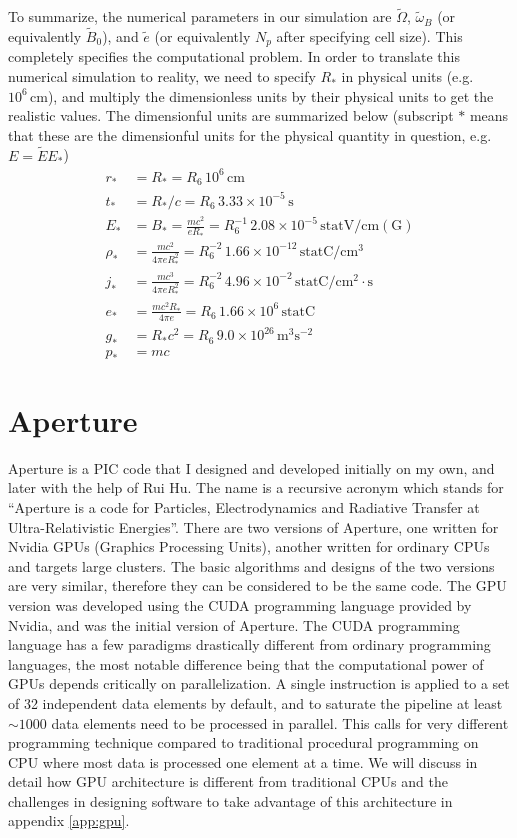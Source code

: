To summarize, the numerical parameters in our simulation are $\tilde{\Omega}$,
$\tilde{\omega}_B$ (or equivalently $\tilde{B}_{0}$), and $\tilde{e}$ (or
equivalently $N_p$ after specifying cell size). This completely specifies the
computational problem. In order to translate this numerical simulation to
reality, we need to specify $R_{*}$ in physical units (e.g.\ $10^6\,
\mathrm{cm}$), and multiply the dimensionless units by their physical units to
get the realistic values. The dimensionful units are summarized below (subscript
$*$ means that these are the dimensionful units for the physical quantity in
question, e.g.\ $E = \tilde{E} E_*$)
\begin{align}
  r_{*} &= R_{*} = R_6\, 10^6\, \mathrm{cm} \\
  t_{*} &= R_{*} / c = R_6\,3.33\times 10^{-5}\, \mathrm{s} \\
  E_{*} &= B_{*} = \frac{mc^2}{eR_{*}} = R_6^{-1}\, 2.08\times 10^{-5}\, \mathrm{statV/cm(G)} \\
  \rho_{*} &= \frac{mc^2}{4\pi eR_{*}^2} = R_{6}^{-2}\, 1.66\times 10^{-12}\, \mathrm{statC/cm^3} \\
  j_{*} &= \frac{mc^3}{4\pi eR_{*}^2} = R_{6}^{-2}\, 4.96\times 10^{-2}\, \mathrm{statC/cm^2\cdot s}  \\
  e_{*} &= \frac{mc^2R_{*}}{4\pi e} = R_6\, 1.66\times 10^6\, \mathrm{statC} \\
  g_{*} &= R_{*}c^2 = R_6\, 9.0\times 10^{26}\, \mathrm{m^3s^{-2}} \\
  p_{*} &= mc
\end{align}

\section{Aperture}
\label{sec:code-aperture}

Aperture is a PIC code that I designed and developed initially on my own, and
later with the help of Rui Hu. The name is a recursive acronym which stands for
``Aperture is a code for Particles, Electrodynamics and Radiative Transfer at
Ultra-Relativistic Energies''. There are two versions of Aperture, one written
for Nvidia GPUs (Graphics Processing Units), another written for ordinary CPUs
and targets large clusters. The basic algorithms and designs of the two versions
are very similar, therefore they can be considered to be the same code. The GPU
version was developed using the CUDA programming language provided by Nvidia,
and was the initial version of Aperture. The CUDA programming language has a few
paradigms drastically different from ordinary programming languages, the most
notable difference being that the computational power of GPUs depends critically
on parallelization. A single instruction is applied to a set of 32 independent
data elements by default, and to saturate the pipeline at least $\sim 1000$ data
elements need to be processed in parallel. This calls for very different
programming technique compared to traditional procedural programming on CPU
where most data is processed one element at a time. We will discuss in detail
how GPU architecture is different from traditional CPUs and the challenges in
designing software to take advantage of this architecture in appendix
\ref{app:gpu}.

